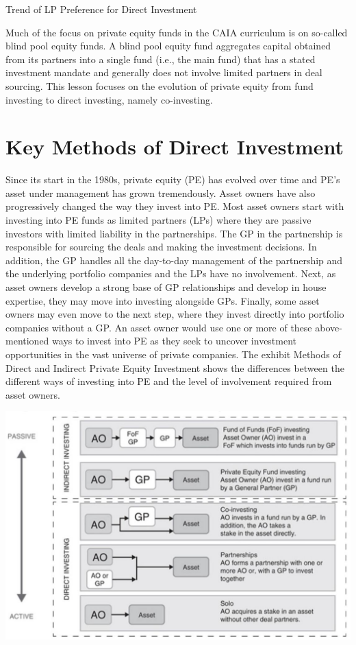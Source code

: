 \documentclass[11pt]{article}
\begin{document}
Trend of LP Preference for Direct Investment

Much of the focus on private equity funds in the CAIA curriculum is on so-called blind pool equity funds. A blind pool equity fund aggregates capital obtained from its partners into a single fund (i.e., the main fund) that has a stated investment mandate and generally does not involve limited partners in deal sourcing. This lesson focuses on the evolution of private equity from fund investing to direct investing, namely co-investing.

\section*{Key Methods of Direct Investment}
Since its start in the 1980s, private equity (PE) has evolved over time and PE's asset under management has grown tremendously. Asset owners have also progressively changed the way they invest into PE. Most asset owners start with investing into PE funds as limited partners (LPs) where they are passive investors with limited liability in the partnerships. The GP in the partnership is responsible for sourcing the deals and making the investment decisions. In addition, the GP handles all the day-to-day management of the partnership and the underlying portfolio companies and the LPs have no involvement. Next, as asset owners develop a strong base of GP relationships and develop in house expertise, they may move into investing alongside GPs. Finally, some asset owners may even move to the next step, where they invest directly into portfolio companies without a GP. An asset owner would use one or more of these above-mentioned ways to invest into PE as they seek to uncover investment opportunities in the vast universe of private companies. The exhibit Methods of Direct and Indirect Private Equity Investment shows the differences between the different ways of investing into PE and the level of involvement required from asset owners.

\begin{center}
\includegraphics[max width=\textwidth]{2024_04_10_b9f91501c03ad990a1d8g-2}
\end{center}
\end{document}
